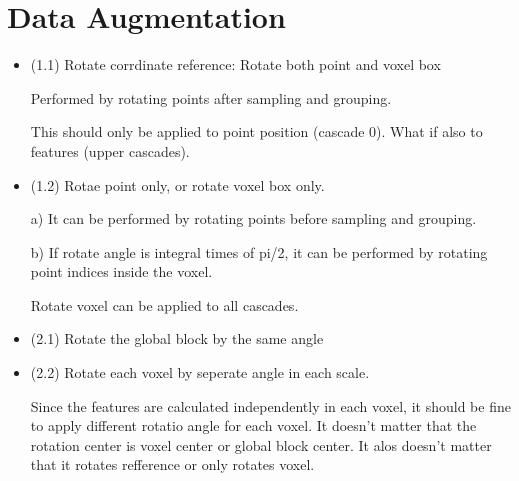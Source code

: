 \documentclass[,table,dvipsnames]{article}
\begin{document}
\section{Data Augmentation} 
\begin{itemize}
\item (1.1) Rotate corrdinate reference: Rotate both point and voxel box \par
Performed by rotating points after sampling and grouping. \par
This should only be applied to point position (cascade 0). What if also to features (upper cascades).

\item (1.2) Rotae point only, or rotate voxel box only. \par
a) It can be performed by rotating points before sampling and grouping.\par
b) If rotate angle is integral times of pi/2, it can be performed by rotating point indices inside the voxel.\par
Rotate voxel can be applied to all cascades.
\item (2.1) Rotate the global block by the same angle
\item (2.2) Rotate each voxel by seperate angle in each scale.\par
Since the features are calculated independently in each voxel, it should be fine to apply different rotatio angle for each voxel. It doesn't matter that the rotation center is voxel center or global block center. It alos doesn't matter that it rotates refference or only rotates voxel.

\end{itemize}
\end{document}
